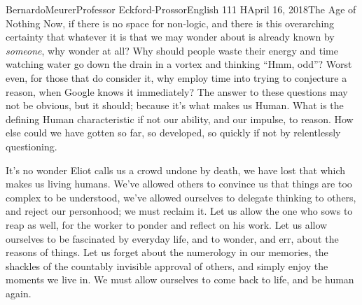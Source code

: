 \documentclass[12pt,letterpaper]{article}
\begin{document}
\begin{mla}{Bernardo}{Meurer}{Professor Eckford-Prossor}{English 111 H}{April 16, 2018}{The Age of Nothing}
    Now, if there is no space for non-logic, and there is this overarching certainty that whatever it is that we may wonder about is already known by \emph{someone}, why wonder at all? Why should people waste their energy and time watching water go down the drain in a vortex and thinking ``Hmm, odd''? Worst even, for those that do consider it, why employ time into trying to conjecture a reason, when Google knows it immediately? The answer to these questions may not be obvious, but it
    should; because it's what makes us Human. What is the defining Human characteristic if not our ability, and our impulse, to reason. How else could we have gotten so far, so developed, so quickly if not by relentlessly questioning.

    It's no wonder Eliot calls us a crowd undone by death, we have lost that which makes us living humans. We've allowed others to convince us that things are too complex to be understood, we've allowed ourselves to delegate thinking to others, and reject our personhood; we must reclaim it. Let us allow the one who sows to reap as well, for the worker to ponder and reflect on his work. Let us allow ourselves to be fascinated by everyday life, and to wonder, and err, about the reasons of things. Let us forget about the numerology in our memories, the shackles of the countably invisible approval of others, and simply enjoy the moments we live in. We must allow ourselves to come back to life, and be human again.
    \newpage
    \printbibliography{}
\end{mla}
\end{document}
